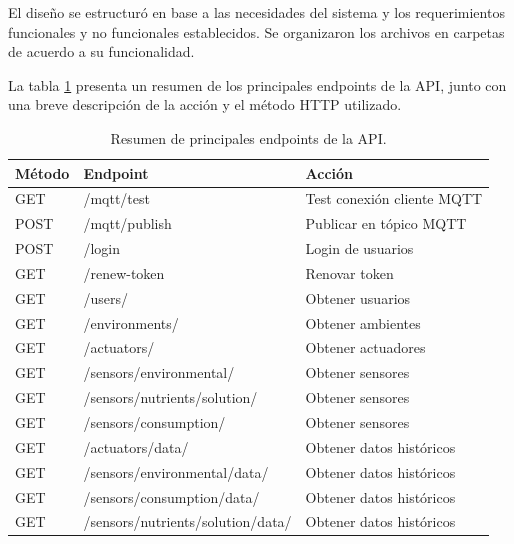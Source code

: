 El diseño se estructuró en base a las necesidades del sistema y los
requerimientos funcionales y no funcionales establecidos. Se organizaron los
archivos en carpetas de acuerdo a su funcionalidad. %

La tabla \ref{tab:endpoints} presenta un resumen de los principales endpoints
de la API, junto con una breve descripción de la acción y el método HTTP
utilizado.

\begin{table}[H]
    \centering
    \caption[Resumen de principales endpoints de la API]{Resumen de principales endpoints de la API.}
    \begin{tabular}{l l l}
        \toprule
        \textbf{Método} & \textbf{Endpoint}                 & \textbf{Acción}            \\
        \midrule
        GET             & /mqtt/test                        & Test conexión cliente MQTT \\
        POST            & /mqtt/publish                     & Publicar en tópico MQTT    \\
        \midrule
        POST            & /login                            & Login de usuarios          \\
        GET             & /renew-token                      & Renovar token              \\
        \midrule
        GET             & /users/                           & Obtener usuarios           \\
        \midrule
        GET             & /environments/                    & Obtener ambientes          \\
        \midrule
        GET             & /actuators/                       & Obtener actuadores         \\
        \midrule
        GET             & /sensors/environmental/           & Obtener sensores           \\
        \midrule
        GET             & /sensors/nutrients/solution/      & Obtener sensores           \\
        \midrule
        GET             & /sensors/consumption/             & Obtener sensores           \\
        \midrule
        GET             & /actuators/data/                  & Obtener datos históricos   \\
        GET             & /sensors/environmental/data/      & Obtener datos históricos   \\
        GET             & /sensors/consumption/data/        & Obtener datos históricos   \\
        GET             & /sensors/nutrients/solution/data/ & Obtener datos históricos   \\
        \bottomrule
        \hline
    \end{tabular}
    \label{tab:endpoints}
\end{table}

